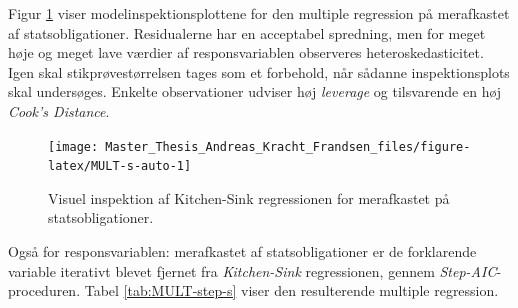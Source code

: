\documentclass[
  a4paper,
  oneside]{memoir}
\begin{document}
\begin{table}[H]
\begin{threeparttable}
\begin{tablenotes}
\end{tablenotes}
\end{threeparttable}
\end{table}

Figur \ref{fig:MULT-s-auto} viser modelinspektionsplottene for den multiple regression på merafkastet af statsobligationer. Residualerne har en acceptabel spredning, men for meget høje og meget lave værdier af responsvariablen observeres heteroskedasticitet. Igen skal stikprøvestørrelsen tages som et forbehold, når sådanne inspektionsplots skal undersøges. Enkelte observationer udviser høj \emph{leverage} og tilsvarende en høj \emph{Cook's Distance}.

\begin{figure}[H]

{\centering \texttt{[image: Master\_Thesis\_Andreas\_Kracht\_Frandsen\_files/figure-latex/MULT-s-auto-1]} 

}

\caption{Visuel inspektion af Kitchen-Sink regressionen for merafkastet på statsobligationer.}\label{fig:MULT-s-auto}
\end{figure}

Også for responsvariablen: merafkastet af statsobligationer er de forklarende variable iterativt blevet fjernet fra \emph{Kitchen-Sink} regressionen, gennem \emph{Step-AIC}-proceduren. Tabel \ref{tab:MULT-step-s} viser den resulterende multiple regression.
\end{document}
